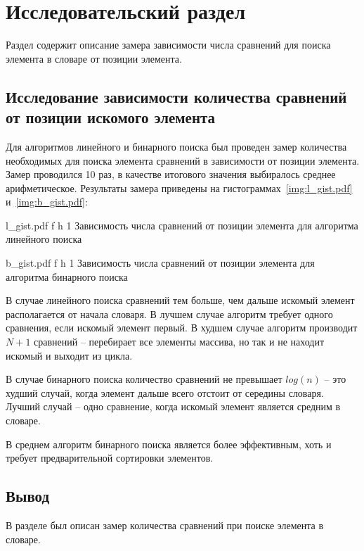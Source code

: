 \chapter{Исследовательский раздел}

Раздел содержит описание замера зависимости числа сравнений для поиска элемента в словаре от позиции элемента.

\section{Исследование зависимости количества сравнений от позиции искомого элемента}

Для алгоритмов линейного и бинарного поиска был проведен замер количества необходимых для поиска элемента сравнений в зависимости от позиции элемента. Замер проводился 10 раз, в качестве итогового значения выбиралось среднее арифметическое. Результаты замера приведены на гистограммах~\ref{img:l_gist.pdf} и~\ref{img:b_gist.pdf}:

{l_gist.pdf} %
{f} %
{h} %
{1 \textwidth} %
{Зависимость числа сравнений от позиции элемента для алгоритма линейного поиска} %


{b_gist.pdf} %
{f} %
{h} %
{1 \textwidth} %
{Зависимость числа сравнений от позиции элемента для алгоритма бинарного поиска} %

\clearpage

В случае линейного поиска сравнений тем больше, чем дальше искомый элемент располагается от начала словаря. В лучшем случае алгоритм требует одного сравнения, если искомый элемент первый. В худшем случае алгоритм производит $N+1$ сравнений -- перебирает все элементы массива, но так и не находит искомый и выходит из цикла.

В случае бинарного поиска количество сравнений не превышает $log(n)$ -- это худший случай, когда элемент дальше всего отстоит от середины словаря. Лучший случай -- одно сравнение, когда искомый элемент является средним в словаре.

В среднем алгоритм бинарного поиска является более эффективным, хоть и требует предварительной сортировки элементов.

\section*{Вывод}

В разделе был описан замер количества сравнений при поиске элемента в словаре.